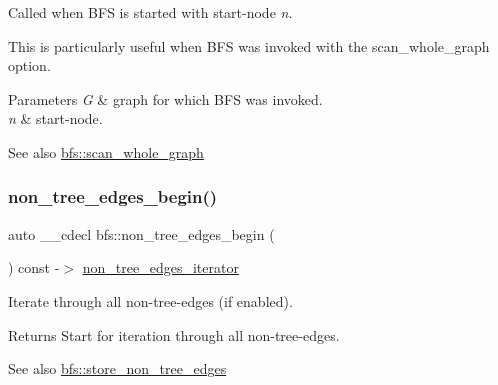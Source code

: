 Called when B\+FS is started with start-\/node {\itshape n}. 

This is particularly useful when B\+FS was invoked with the {\ttfamily scan\+\_\+whole\+\_\+graph} option.


\begin{DoxyParams}{Parameters}
{\em G} & graph for which B\+FS was invoked. \\
\hline
{\em n} & start-\/node. \\
\hline
\end{DoxyParams}
\begin{DoxySeeAlso}{See also}
\mbox{\hyperlink{classbfs_ac58d930764e6aa859fe706b1d916b9ad}{bfs\+::scan\+\_\+whole\+\_\+graph}} 
\end{DoxySeeAlso}
\mbox{\label{classbfs_a15d846159cfe9524081ad318fb72661f}} 
\subsubsection{\texorpdfstring{non\+\_\+tree\+\_\+edges\+\_\+begin()}{non\_tree\_edges\_begin()}}
{\footnotesize\ttfamily auto \+\_\+\+\_\+cdecl bfs\+::non\+\_\+tree\+\_\+edges\+\_\+begin (\begin{DoxyParamCaption}{ }\end{DoxyParamCaption}) const -\/$>$ \mbox{\hyperlink{classbfs_aecd86c7c1f1086d4b6b11c2a0eb12afe}{non\+\_\+tree\+\_\+edges\+\_\+iterator}}
	\hspace{0.3cm}{\ttfamily [inline]}}



Iterate through all non-\/tree-\/edges (if enabled). 

\begin{DoxyReturn}{Returns}
Start for iteration through all non-\/tree-\/edges. 
\end{DoxyReturn}
\begin{DoxySeeAlso}{See also}
\mbox{\hyperlink{classbfs_afed1aa751dbea4b6fb9dbdcea24b04f2}{bfs\+::store\+\_\+non\+\_\+tree\+\_\+edges}} 
\end{DoxySeeAlso}
\mbox{\label{classbfs_ae4d59095371f625a831de4262ab16d31}} 
